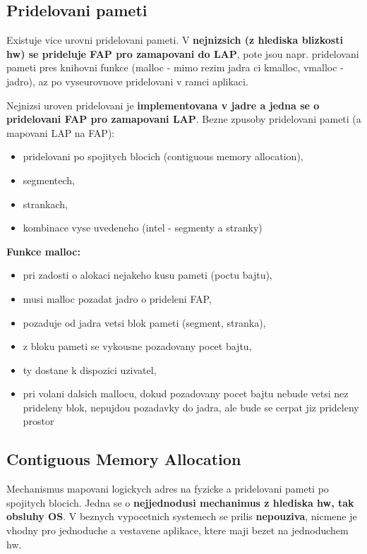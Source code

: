 \documentclass[a4paper, 11pt]{article}
\begin{document}
\newpage

\subsection{Pridelovani pameti}
Existuje vice urovni pridelovani pameti. V \textbf{nejnizsich (z hlediska blizkosti hw) se prideluje FAP pro zamapovani do LAP}, pote jsou napr. pridelovani pameti pres knihovni funkce (malloc - mimo rezim jadra ci kmalloc, vmalloc - jadro), az po vyseurovnove pridelovani v ramci aplikaci. 

Nejnizsi uroven pridelovani je \textbf{implementovana v jadre a jedna se o pridelovani FAP pro zamapovani LAP}. Bezne zpusoby pridelovani pameti (a mapovani LAP na FAP):
\begin{itemize}
    \item pridelovani po spojitych blocich (contiguous memory allocation),
    \item segmentech,
    \item strankach,
    \item kombinace vyse uvedeneho (intel - segmenty a stranky) \\
\end{itemize}

\textbf{Funkce malloc:}
\begin{itemize}
    \item pri zadosti o alokaci nejakeho kusu pameti (poctu bajtu),
    \item musi malloc pozadat jadro o prideleni FAP,
    \item pozaduje od jadra vetsi blok pameti (segment, stranka),
    \item z bloku pameti se vykousne pozadovany pocet bajtu,
    \item ty dostane k dispozici uzivatel,
    \item pri volani dalsich mallocu, dokud pozadovany pocet bajtu nebude vetsi nez prideleny blok, nepujdou pozadavky do jadra, ale bude se cerpat jiz prideleny prostor \\
\end{itemize}

\subsection{Contiguous Memory Allocation}
Mechanismus mapovani logickych adres na fyzicke a pridelovani pameti po spojitych blocich. Jedna se o \textbf{nejjednodusi mechanimus z hlediska hw, tak obsluhy OS}. V beznych vypocetnich systemech se prilis \textbf{nepouziva}, nicmene je vhodny pro jednoduche a vestavene aplikace, ktere maji bezet na jednoduchem hw.
\end{document}

